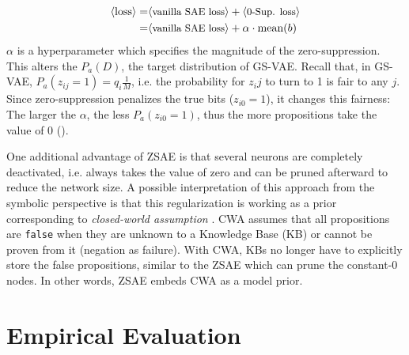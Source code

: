 \begin{align*}
 \brackets{\text{loss}} = & \brackets{\text{\small vanilla SAE loss}} + \brackets{\text{\small 0-Sup. loss}} \\ 
 =                        & \brackets{\text{\small vanilla SAE loss}} + \alpha\cdot\text{mean}(b)
\end{align*}
$\alpha$ is a hyperparameter which specifies the magnitude of the zero-suppression.
% 
This alters the $P_a(D)$, the target distribution of GS-VAE.
Recall that, in GS-VAE, $P_a(z_{ij}=1)=q_i\frac{1}{M}$, i.e. the probability for $z_ij$ to turn to 1 is fair to any $j$.
Since zero-suppression penalizes the true bits ($z_{i0}=1$), it changes this fairness: The larger the $\alpha$,
the less $P_a(z_{i0}=1)$,
thus the more propositions take the value of 0 ().

One additional advantage of ZSAE is that
several neurons are completely deactivated, i.e. always takes the value of zero
and can be pruned afterward to reduce the network size.
% 
A possible interpretation of this approach from the symbolic perspective is that
this regularization is working as a prior corresponding to \emph{closed-world assumption} \cite[CWA]{reiter1981closed}.
CWA assumes that all propositions are \texttt{false}
when they are unknown to a Knowledge Base (KB) or cannot be proven from it (negation as failure).
With CWA, KBs no longer have to explicitly store the false propositions,
similar to the ZSAE which can prune the constant-0 nodes.
% 
In other words,
ZSAE embeds CWA as a model prior.


\section{Empirical Evaluation}
\label{evaluation}

